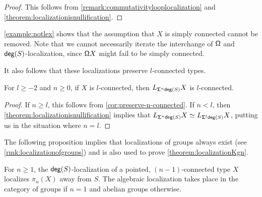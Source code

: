 \begin{proof}
This follows from \cref{remark:commutativitylooplocalization} and \cref{theorem:localizationisnullification}.
\end{proof}

\cref{example:notlex} shows that the assumption that $X$ is simply connected cannot be removed.
Note that we cannot necessarily iterate the interchange of $\loopspacesym$ and $\degg(S)$-localization,
since $\loopspacesym X$ might fail to be simply connected.

\medskip

It also follows that these localizations preserve $l$-connected types.

\begin{cor}\label{corollary:plocalizationpreservesconnectedness}
    For $l \geq -2$ and $n \geq 0$, if $X$ is $l$-connected, then $L_{\susp[n] \degg(S)} X$ is $l$-connected.
\end{cor}

\begin{proof}
    If $n \geq l$, this follows from \cref{cor:preserve-n-connected}.
    If $n < l$, then \cref{theorem:localizationisnullification} implies
    that $L_{\susp[n] \degg(S)} X \eqvsym L_{\susp[l] \degg(S)} X$, putting us
    in the situation where $n = l$.
\end{proof}

The following proposition implies that localizations of groups always exist
(see \cref{rmk:localizationofgroups})
and is also used to prove \cref{theorem:localizationKgn}.

\begin{prp}\label{lemma:localizationlocalizesfirst}
    For $n \geq 1$,
    the $\degg(S)$-localization of a pointed, $(n-1)$-connected type $X$ localizes $\pi_n(X)$ away from $S$.
    The algebraic localization takes place in the category of groups if $n = 1$ and
    abelian groups otherwise.
\end{prp}

